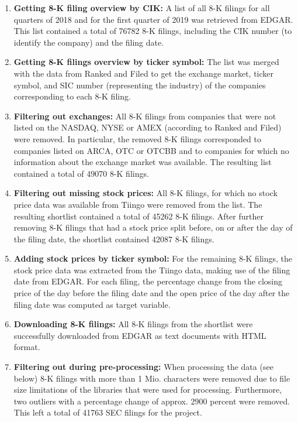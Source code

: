 \documentclass{article}
\begin{document}
	\begin{enumerate}
		\item \textbf{Getting 8-K filing overview by CIK:} A list of all 8-K filings for all quarters of 2018 and for the first quarter of 2019 was retrieved from EDGAR. This list contained a total of 76782 8-K filings, including the CIK number (to identify the company) and the filing date.
		\item \textbf{Getting 8-K filings overview by ticker symbol:} The list was merged with the data from Ranked and Filed to get the exchange market, ticker symbol, and SIC number (representing the industry) of the companies corresponding to each 8-K filing.
		\item \textbf{Filtering out exchanges:} All  8-K filings from companies that were not listed on the NASDAQ, NYSE or AMEX (according to Ranked and Filed) were removed. In particular, the removed 8-K filings corresponded to companies listed on ARCA, OTC or OTCBB and to companies for which no information about the exchange market was available. The resulting list contained a total of 49070 8-K filings.
		\item \textbf{Filtering out missing stock prices:} All 8-K filings, for which no stock price data was available from Tiingo were removed from the list. The resulting shortlist contained a total of 45262 8-K filings. After further removing 8-K filings that had a stock price split before, on or after the day of the filing date, the shortlist contained 42087  8-K filings.
		\item \textbf{Adding stock prices by ticker symbol:} For the remaining 8-K filings, the stock price data was extracted from the Tiingo data, making use of the filing date from EDGAR. For each filing, the percentage change from the closing price of the day before the filing date and the open price of the day after the filing date was computed as target variable.
		\item \textbf{Downloading 8-K filings:} All 8-K filings from the shortlist were successfully downloaded from EDGAR as text documents with HTML format.
		\item \textbf{Filtering out during pre-processing:} When processing the data (see below) 8-K filings with more than 1 Mio. characters were removed due to file size limitations of the libraries that were used for processing. Furthermore, two outliers with a percentage change of approx. $2900$ percent were removed. This left a total of 41763 SEC filings for the project.

		
	\end{enumerate}
	
\end{document}
